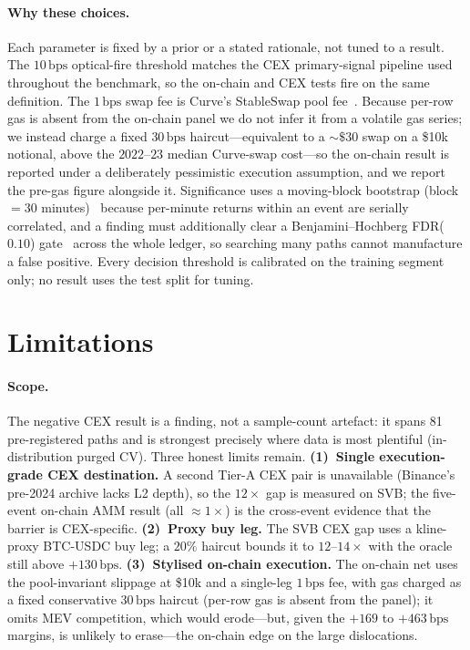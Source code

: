 \documentclass[sigconf,anonymous,natbib=false]{acmart}
\newcommand{\bps}{\,\text{bps}}
\begin{document}
\paragraph{Why these choices.} Each parameter is fixed by a prior or a stated rationale, not tuned to a
result. The $10\bps$ optical-fire threshold matches the CEX primary-signal pipeline used throughout the
benchmark, so the on-chain and CEX tests fire on the same definition. The $1\bps$ swap fee is Curve's
StableSwap pool fee~\cite{egorov2019stableswap}. Because per-row gas is absent from the on-chain panel we
do not infer it from a volatile gas series; we instead charge a fixed $30\bps$ haircut---equivalent to a
$\sim\!\$30$ swap on a \$10k notional, above the $2022$--$23$ median Curve-swap cost---so the on-chain
result is reported under a deliberately pessimistic execution assumption, and we report the pre-gas figure
alongside it. Significance uses a moving-block bootstrap (block $=30$ minutes)~\cite{politis1994stationary}
because per-minute returns within an event are serially correlated, and a finding must additionally clear a
Benjamini--Hochberg FDR($0.10$) gate~\cite{benjamini1995fdr} across the whole ledger, so searching many
paths cannot manufacture a false positive. Every decision threshold is calibrated on the training segment
only; no result uses the test split for tuning.



\section{Limitations}
\label{sec:limitations}
\paragraph{Scope.}
The negative CEX result is a finding, not a sample-count artefact: it spans 81 pre-registered
paths and is strongest precisely where data is most plentiful (in-distribution purged CV). Three
honest limits remain.
\textbf{(1)~Single execution-grade CEX destination.} A second Tier-A CEX pair is unavailable
(Binance's pre-2024 archive lacks L2 depth), so the $12{\times}$ gap is measured on SVB; the
five-event on-chain AMM result (all ${\approx}1{\times}$) is the cross-event evidence that the
barrier is CEX-specific.
\textbf{(2)~Proxy buy leg.} The SVB CEX gap uses a kline-proxy BTC-USDC buy leg; a $20\%$
haircut bounds it to $12$--$14{\times}$ with the oracle still above $+130\bps$.
\textbf{(3)~Stylised on-chain execution.} The on-chain net uses the pool-invariant slippage at
\$10k and a single-leg $1\bps$ fee, with gas charged as a fixed conservative $30\bps$ haircut
(per-row gas is absent from the panel); it omits MEV competition, which would erode---but, given
the $+169$ to $+463\bps$ margins, is unlikely to erase---the on-chain edge on the large dislocations.
\end{document}
